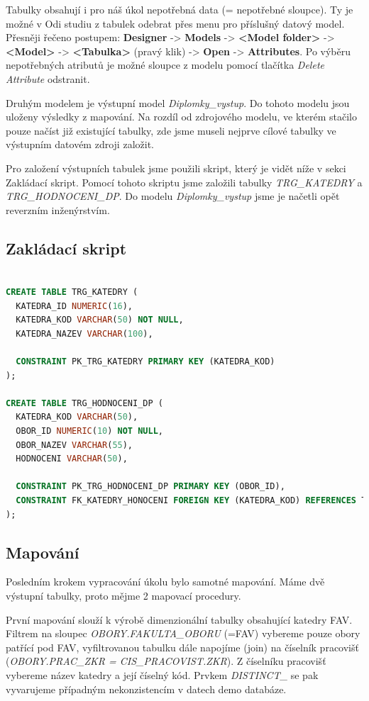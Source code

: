 Tabulky obsahují i pro náš úkol nepotřebná data (= nepotřebné sloupce).
Ty je možné v Odi studiu z tabulek odebrat přes menu pro příslušný datový model.
Přesněji řečeno postupem: \textbf{Designer} -> \textbf{Models} -> \textbf{<Model folder>} -> \textbf{<Model>} -> \textbf{<Tabulka>} (pravý klik) -> \textbf{Open} -> \textbf{Attributes}.
Po výběru nepotřebných atributů je možné sloupce z modelu pomocí tlačítka \textit{Delete Attribute} odstranit.

Druhým modelem je výstupní model \textit{Diplomky\_vystup}.
Do tohoto modelu jsou uloženy výsledky z mapování.
Na rozdíl od zdrojového modelu, ve kterém stačilo pouze načíst již existující tabulky, zde jsme museli nejprve cílové tabulky ve výstupním datovém zdroji založit.

Pro založení výstupních tabulek jsme použili skript, který je vidět níže v sekci Zakládací skript.
Pomocí tohoto skriptu jsme založili tabulky \textit{TRG\_KATEDRY} a \textit{TRG\_HODNOCENI\_DP}.
Do modelu \textit{Diplomky\_vystup} jsme je načetli opět reverzním inženýrstvím.

\subsection{Zakládací skript}

\begin{lstlisting}[language=sql]

CREATE TABLE TRG_KATEDRY (
  KATEDRA_ID NUMERIC(16),
  KATEDRA_KOD VARCHAR(50) NOT NULL,
  KATEDRA_NAZEV VARCHAR(100),

  CONSTRAINT PK_TRG_KATEDRY PRIMARY KEY (KATEDRA_KOD)
);

CREATE TABLE TRG_HODNOCENI_DP (
  KATEDRA_KOD VARCHAR(50),
  OBOR_ID NUMERIC(10) NOT NULL,
  OBOR_NAZEV VARCHAR(55),
  HODNOCENI VARCHAR(50),

  CONSTRAINT PK_TRG_HODNOCENI_DP PRIMARY KEY (OBOR_ID),
  CONSTRAINT FK_KATEDRY_HONOCENI FOREIGN KEY (KATEDRA_KOD) REFERENCES TRG_KATEDRY (KATEDRA_KOD)
);
\end{lstlisting}

\subsection{Mapování}

Posledním krokem vypracování úkolu bylo samotné mapování.
Máme dvě výstupní tabulky, proto mějme 2 mapovací procedury.

První mapování slouží k výrobě dimenzionální tabulky obsahující katedry FAV.
Filtrem na sloupec \textit{OBORY.FAKULTA\_OBORU} (=FAV) vybereme pouze obory patřící pod FAV, vyfiltrovanou tabulku dále napojíme (join) na číselník pracovišť (\textit{OBORY.PRAC\_ZKR = CIS\_PRACOVIST.ZKR}).
Z číselníku pracovišť vybereme název katedry a její číselný kód.
Prvkem \textit{DISTINCT\_} se pak vyvarujeme případným nekonzistencím v datech demo databáze.

